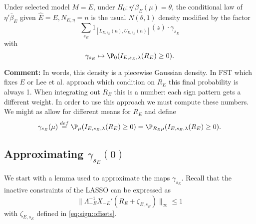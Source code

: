 \documentclass{article}
\newcommand{\OLS}{\bar{\beta}}
\begin{document}
        \begin{lemma}
          Under selected model $M=E$, under
          $H_0:\eta'\beta_E(\mu)=\theta$, the conditional law of
          $\eta'\OLS_E$ given $\hat{E}=E, N_{E,\eta}=n$ is the usual
          $N(\theta, 1)$ density modified by the factor
          \begin{equation}
            \label{eq:union}
            \sum_{s_E} 1_{[L_{E,s_E}(n), U_{E,s_E}(n)]}(z) \cdot
            \gamma_{s_E}
            \end{equation}
          with
        $$ \gamma_{s_E} \mapsto \P_0(I_{E,s_E,\lambda}(R_E) \geq 0).
        $$
          \end{lemma}

        {\bf Comment:} In words, this density is a piecewise Gaussian
        density. In FST which fixes $E$ or Lee et al. approach which
        condition on $R_E$ this final probability is always 1. When
        integrating out $R_E$ this is a number: each sign pattern gets
        a different weight. In order to use this approach we must
        compute these numbers.  We might as allow for different means
        for $R_E$ and define
          \begin{equation}
            \label{eq:sign:prob}
            \gamma_{s_E}(\mu) \overset{def}{=} \P_{\mu}(I_{E,s_E,\lambda}(R_E)
            \geq 0) = \P_{R_E\mu}(I_{E,s_E,\lambda}(R_E) \geq 0).
          \end{equation}
        
          \subsection{Approximating $\gamma_{s_E}(0)$}

          We start with a lemma used to approximate the maps
          $\gamma_{s_E}$. Recall that the inactive constraints of the
          LASSO can be expressed as
          \begin{equation}
            \label{eq:inactive}
            \|\Lambda_{-E}^{-1}X_{-E}'(R_E + \zeta_{E,s_E})\|_{\infty}
            \leq 1
            \end{equation}
          with $\zeta_{E,s_E}$ defined in \eqref{eq:sign:offsets}.
\end{document}
